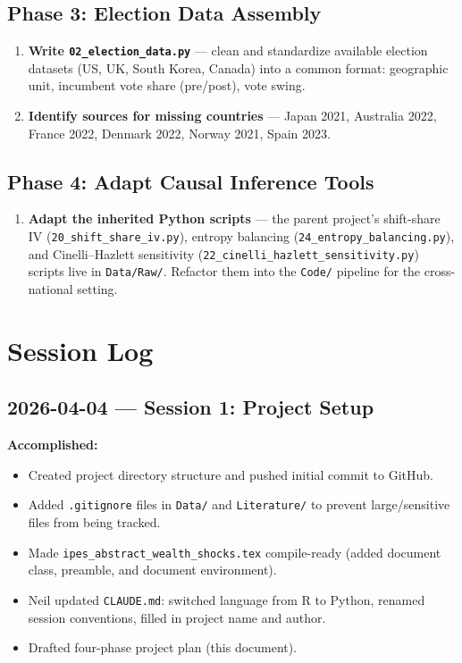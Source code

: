 \documentclass[11pt]{article}
\begin{document}
\subsection{Phase 3: Election Data Assembly}

\begin{enumerate}[resume]
  \item \textbf{Write \texttt{02\_election\_data.py}} --- clean and standardize available election datasets (US, UK, South Korea, Canada) into a common format: geographic unit, incumbent vote share (pre/post), vote swing.
  \item \textbf{Identify sources for missing countries} --- Japan 2021, Australia 2022, France 2022, Denmark 2022, Norway 2021, Spain 2023.
\end{enumerate}

\subsection{Phase 4: Adapt Causal Inference Tools}

\begin{enumerate}[resume]
  \item \textbf{Adapt the inherited Python scripts} --- the parent project's shift-share IV (\texttt{20\_shift\_share\_iv.py}), entropy balancing (\texttt{24\_entropy\_balancing.py}), and Cinelli--Hazlett sensitivity (\texttt{22\_cinelli\_hazlett\_sensitivity.py}) scripts live in \texttt{Data/Raw/}. Refactor them into the \texttt{Code/} pipeline for the cross-national setting.
\end{enumerate}

\section{Session Log}
\label{sec:sessions}

\subsection{2026-04-04 --- Session 1: Project Setup}

\textbf{Accomplished:}
\begin{itemize}
  \item Created project directory structure and pushed initial commit to GitHub.
  \item Added \texttt{.gitignore} files in \texttt{Data/} and \texttt{Literature/} to prevent large/sensitive files from being tracked.
  \item Made \texttt{ipes\_abstract\_wealth\_shocks.tex} compile-ready (added document class, preamble, and document environment).
  \item Neil updated \texttt{CLAUDE.md}: switched language from R to Python, renamed session conventions, filled in project name and author.
  \item Drafted four-phase project plan (this document).
\end{itemize}
\end{document}
